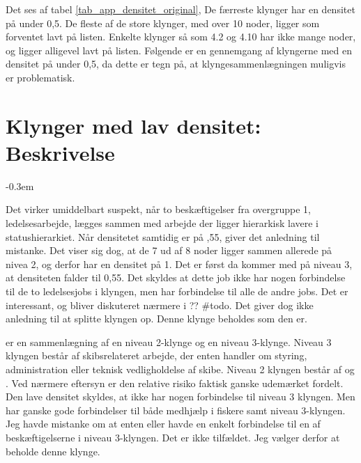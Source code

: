 % 

Det ses af tabel \ref{tab_app_densitet_original}, De færreste klynger har en densitet på under 0,5. De fleste af de store klynger, med over 10 noder, ligger som forventet lavt på listen. Enkelte klynger så som 4.2 og 4.10 har ikke mange noder, og ligger alligevel lavt på listen. Følgende er en gennemgang af klyngerne med en densitet på under 0,5, da dette er tegn på, at klyngesammenlægningen muligvis er problematisk. 
%
\section{Klynger med lav densitet: Beskrivelse}
%

%
\begin{description}
\itemsep-0.3em

    \item[\underline{Klynge 3.8}] Det virker umiddelbart suspekt, når to beskæftigelser fra overgruppe 1, ledelsesarbejde, lægges sammen med arbejde der ligger hierarkisk lavere i statushierarkiet. Når densitetet samtidig er på ,55, giver det anledning til mistanke. Det viser sig dog, at de 7 ud af 8 noder ligger sammen allerede på nivea 2, og derfor har en densitet på 1. Det er først da  kommer med på niveau 3, at densiteten falder til 0,55. Det skyldes at dette job ikke har nogen forbindelse til de to ledelsesjobs i klyngen, men har forbindelse til alle de andre jobs. Det er interessant, og bliver diskuteret nærmere i ?? \#todo. Det giver dog ikke anledning til at splitte klyngen op. Denne klynge beholdes som den er.

    \item[\underline{Klynge 4.2}] er en sammenlægning af en niveau 2-klynge og en niveau 3-klynge. Niveau 3 klyngen består af skibsrelateret arbejde, der enten handler om styring, administration eller teknisk vedligholdelse af skibe. Niveau 2 klyngen består af  og . Ved nærmere eftersyn er den relative risiko faktisk ganske udemærket fordelt. Den lave densitet skyldes, at  ikke har nogen forbindelse til niveau 3 klyngen. Men  har ganske gode forbindelser til både medhjælp i fiskere samt niveau 3-klyngen. Jeg havde mistanke om at enten  eller  havde en enkelt forbindelse til en af beskæftigelserne i niveau 3-klyngen. Det er ikke tilfældet. Jeg vælger derfor at beholde denne klynge. 


\end{description}
